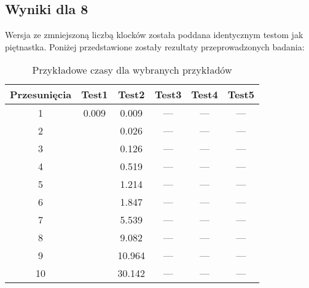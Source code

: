     \subsection{Wyniki dla 8}
        Wersja ze zmniejszoną liczbą klocków została poddana identycznym testom jak piętnastka. Poniżej przedstawione zostały rezultaty 
        przeprowadzonych badania:

        \begin{table}[H]
            \centering
             \begin{tabular}{||c | c | c | c | c | c |} 
             \hline
             Przesunięcia & Test1 & Test2 & Test3 & Test4 & Test5 \\ [0.5ex] 
             \hline\hline
             1 & 0.009 & 0.009 & --- & --- & --- \\ 
             \hline
             2 &  & 0.026 & --- & --- & --- \\
             \hline
             3 &  & 0.126 & --- & --- & --- \\
             \hline
             4 &  & 0.519 & --- & --- & --- \\
             \hline
             5 &  & 1.214 & --- & --- & --- \\
             \hline
             6 &  & 1.847 & --- & --- & ---\\ 
             \hline
             7 &  & 5.539 & --- & --- & --- \\
             \hline
             8 &  & 9.082 & --- & --- & --- \\
             \hline
             9 &  & 10.964 & --- & --- & --- \\
             \hline
             10 &  & 30.142 & --- & --- & --- \\ [1ex]
             \hline
             \end{tabular}
             \caption{Przykładowe czasy dla wybranych przykładów}
        \end{table}
    
